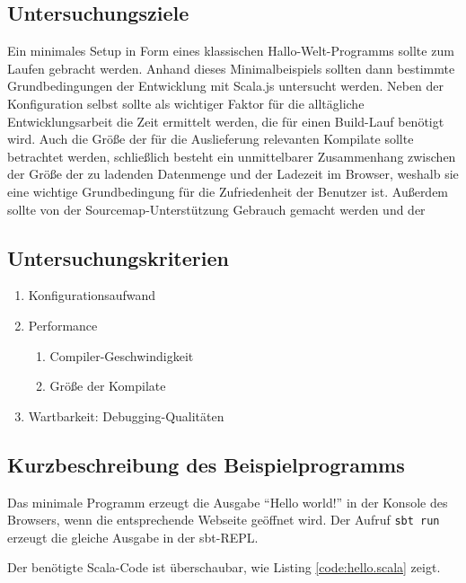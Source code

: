 \documentclass[a4paper, 12pt, listof=totoc, bibliography=totoc]{scrreprt}
\begin{document}
\subsection{Untersuchungsziele}

Ein minimales Setup in Form eines klassischen Hallo-Welt-Programms sollte zum Laufen gebracht werden. Anhand dieses Minimalbeispiels sollten dann bestimmte Grundbedingungen der Entwicklung mit Scala.js untersucht werden. Neben der Konfiguration selbst sollte als wichtiger Faktor für die alltägliche Entwicklungsarbeit die Zeit ermittelt werden, die für einen Build-Lauf benötigt wird. Auch die Größe der für die Auslieferung relevanten Kompilate sollte betrachtet werden, schließlich besteht ein unmittelbarer Zusammenhang zwischen der Größe der zu ladenden Datenmenge und der Ladezeit im Browser, weshalb sie eine wichtige Grundbedingung für die Zufriedenheit der Benutzer ist.
Außerdem sollte von der  Sourcemap-Unterstützung Gebrauch gemacht werden und der 

\subsection{Untersuchungskriterien}

\begin{enumerate}
	\item Konfigurationsaufwand
	\item Performance
	\begin{enumerate}
		\item Compiler-Geschwindigkeit
		\item Größe der Kompilate
	\end{enumerate}
	\item Wartbarkeit: Debugging-Qualitäten
\end{enumerate}

\subsection{Kurzbeschreibung des Beispielprogramms}

Das minimale Programm erzeugt die Ausgabe "`Hello world!"' in der Konsole des Browsers, wenn die entsprechende Webseite geöffnet wird. Der Aufruf \texttt{sbt run} erzeugt die gleiche Ausgabe in der sbt-REPL.

Der benötigte Scala-Code ist überschaubar, wie Listing \ref{code:hello.scala} zeigt.


\end{document}
